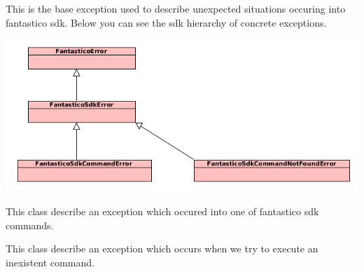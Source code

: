 \documentclass[letterpaper,10pt,english]{sphinxmanual}
\begin{document}
\begin{fulllineitems}
\label{features/sdk:fantastico.sdk.sdk_exceptions.FantasticoSdkError}
This is the base exception used to describe unexpected situations occuring into fantastico sdk. Below you can see the
sdk hierarchy of concrete exceptions.

\includegraphics{exceptions1.png}

\end{fulllineitems}


\begin{fulllineitems}
\label{features/sdk:fantastico.sdk.sdk_exceptions.FantasticoSdkCommandError}
This class describe an exception which occured into one of fantastico sdk commands.

\end{fulllineitems}


\begin{fulllineitems}
\label{features/sdk:fantastico.sdk.sdk_exceptions.FantasticoSdkCommandNotFoundError}
This class describe an exception which occurs when we try to execute an inexistent command.

\end{fulllineitems}
\end{document}
